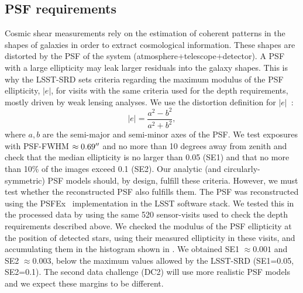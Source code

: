 \documentclass[a4paper,fleqn,usenatbib]{mnras}
\begin{document}
\subsection{PSF requirements}
\label{sssec:psf}
Cosmic shear measurements rely on the estimation of coherent patterns in the shapes of galaxies in order to extract cosmological information. These shapes are distorted by the PSF of the system (atmosphere+telescope+detector). A PSF with a large ellipticity may leak larger residuals into the galaxy shapes. This is why the LSST-SRD sets criteria regarding the maximum modulus of the PSF ellipticity, $|e|$, for visits with the same criteria used for the depth requirements, mostly driven by weak lensing analyses. We use the distortion definition for $|e|$~\citep{1991ApJ...380....1M}:
\begin{equation}
|e| = \frac{a^{2} - b^{2}}{a^{2}+b^{2}},
\end{equation}
where $a, b$ are the semi-major and semi-minor axes of the PSF. We test exposures with PSF-FWHM $\approx 0.69\hbox{$^{\prime\prime}$}$ and no more than 10 degrees away from zenith and check that the median ellipticity is no larger than 0.05 (SE1) and that no more than 10\% of the images exceed 0.1 (SE2). Our analytic (and circularly-symmetric) PSF models should, by design, fulfill these criteria. However, we must test whether the reconstructed PSF also fulfills them. The PSF was reconstructed using the PSFEx~\citep{2011ASPC..442..435B} implementation in the LSST software stack. We tested this in the processed data by using the same 520 sensor-visits used to check the depth requirements described above. We checked the modulus of the PSF ellipticity at the position of detected stars, using their measured ellipticity in these visits, and accumulating them in the histogram shown in . We obtained SE1 $\approx 0.001$ and SE2 $\approx 0.003$, below the maximum values allowed by the LSST-SRD (SE1=0.05, SE2=0.1). The second data challenge (DC2) will use more realistic PSF models and we expect these margins to be different.
\end{document}
